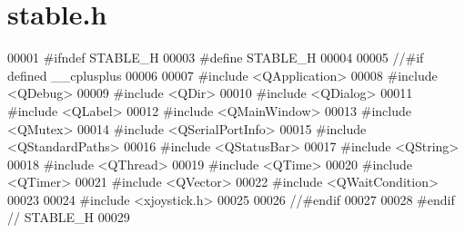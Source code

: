 \hypertarget{stable_8h_source}{}\section{stable.\+h}

\begin{DoxyCode}
00001 \textcolor{preprocessor}{#ifndef STABLE\_H}
00003 \textcolor{preprocessor}{#define STABLE\_H}
00004 
00005 \textcolor{comment}{//#if defined \_\_cplusplus}
00006 
00007 \textcolor{preprocessor}{#include <QApplication>}
00008 \textcolor{preprocessor}{#include <QDebug>}
00009 \textcolor{preprocessor}{#include <QDir>}
00010 \textcolor{preprocessor}{#include <QDialog>}
00011 \textcolor{preprocessor}{#include <QLabel>}
00012 \textcolor{preprocessor}{#include <QMainWindow>}
00013 \textcolor{preprocessor}{#include <QMutex>}
00014 \textcolor{preprocessor}{#include <QSerialPortInfo>}
00015 \textcolor{preprocessor}{#include <QStandardPaths>}
00016 \textcolor{preprocessor}{#include <QStatusBar>}
00017 \textcolor{preprocessor}{#include <QString>}
00018 \textcolor{preprocessor}{#include <QThread>}
00019 \textcolor{preprocessor}{#include <QTime>}
00020 \textcolor{preprocessor}{#include <QTimer>}
00021 \textcolor{preprocessor}{#include <QVector>}
00022 \textcolor{preprocessor}{#include <QWaitCondition>}
00023 
00024 \textcolor{preprocessor}{#include <xjoystick.h>}
00025 
00026 \textcolor{comment}{//#endif}
00027 
00028 \textcolor{preprocessor}{#endif // STABLE\_H}
00029 
\end{DoxyCode}

